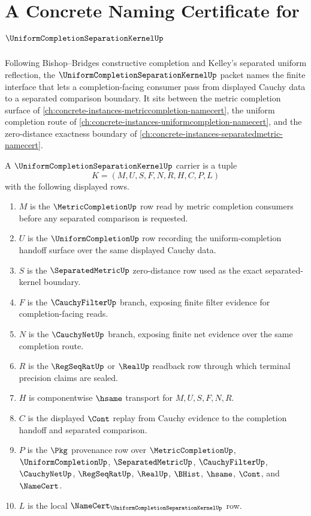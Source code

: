\chapter{A Concrete Naming Certificate for $\UniformCompletionSeparationKernelUp$}
\label{ch:concrete-instances-uniform-completion-separation-kernel-namecert}

Following Bishop--Bridges constructive completion and Kelley's separated uniform reflection, the $\UniformCompletionSeparationKernelUp$ packet names the finite interface that lets a completion-facing consumer pass from displayed Cauchy data to a separated comparison boundary. It sits between the metric completion surface of \autoref{ch:concrete-instances-metriccompletion-namecert}, the uniform completion route of \autoref{ch:concrete-instances-uniformcompletion-namecert}, and the zero-distance exactness boundary of \autoref{ch:concrete-instances-separatedmetric-namecert}.

\begin{definition}
\label{def:uniform-completion-separation-kernel-carrier}
A $\UniformCompletionSeparationKernelUp$ carrier is a tuple
$$
K=(M,U,S,F,N,R,H,C,P,L)
$$
with the following displayed rows.
\begin{enumerate}
\item $M$ is the $\MetricCompletionUp$ row read by metric completion consumers before any separated comparison is requested.
\item $U$ is the $\UniformCompletionUp$ row recording the uniform-completion handoff surface over the same displayed Cauchy data.
\item $S$ is the $\SeparatedMetricUp$ zero-distance row used as the exact separated-kernel boundary.
\item $F$ is the $\CauchyFilterUp$ branch, exposing finite filter evidence for completion-facing reads.
\item $N$ is the $\CauchyNetUp$ branch, exposing finite net evidence over the same completion route.
\item $R$ is the $\RegSeqRatUp$ or $\RealUp$ readback row through which terminal precision claims are sealed.
\item $H$ is componentwise $\hsame$ transport for $M,U,S,F,N,R$.
\item $C$ is the displayed $\Cont$ replay from Cauchy evidence to the completion handoff and separated comparison.
\item $P$ is the $\Pkg$ provenance row over $\MetricCompletionUp$, $\UniformCompletionUp$, $\SeparatedMetricUp$, $\CauchyFilterUp$, $\CauchyNetUp$, $\RegSeqRatUp$, $\RealUp$, $\BHist$, $\hsame$, $\Cont$, and $\NameCert$.
\item $L$ is the local $\NameCert_{\UniformCompletionSeparationKernelUp}$ row.
\end{enumerate}
\end{definition}

